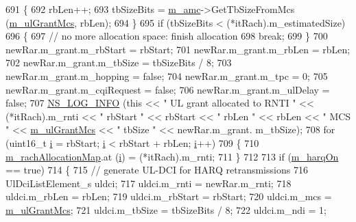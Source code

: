 \begin{DoxyCode}
691         \{
692           rbLen++;
693           tbSizeBits = \hyperlink{classns3_1_1TdBetFfMacScheduler_a3ba724ed3776a6cb493df6dd91b810d6}{m\_amc}->GetTbSizeFromMcs (\hyperlink{classns3_1_1TdBetFfMacScheduler_ae0ced77c5d773079c66921b86561de8c}{m\_ulGrantMcs}, rbLen);
694         \}
695       \textcolor{keywordflow}{if} (tbSizeBits < (*itRach).m\_estimatedSize)
696         \{
697           \textcolor{comment}{// no more allocation space: finish allocation}
698           \textcolor{keywordflow}{break};
699         \}
700       newRar.m\_grant.m\_rbStart = rbStart;
701       newRar.m\_grant.m\_rbLen = rbLen;
702       newRar.m\_grant.m\_tbSize = tbSizeBits / 8;
703       newRar.m\_grant.m\_hopping = \textcolor{keyword}{false};
704       newRar.m\_grant.m\_tpc = 0;
705       newRar.m\_grant.m\_cqiRequest = \textcolor{keyword}{false};
706       newRar.m\_grant.m\_ulDelay = \textcolor{keyword}{false};
707       \hyperlink{group__logging_gafbd73ee2cf9f26b319f49086d8e860fb}{NS\_LOG\_INFO} (\textcolor{keyword}{this} << \textcolor{stringliteral}{" UL grant allocated to RNTI "} << (*itRach).m\_rnti << \textcolor{stringliteral}{" rbStart "} << 
      rbStart << \textcolor{stringliteral}{" rbLen "} << rbLen << \textcolor{stringliteral}{" MCS "} << \hyperlink{classns3_1_1TdBetFfMacScheduler_ae0ced77c5d773079c66921b86561de8c}{m\_ulGrantMcs} << \textcolor{stringliteral}{" tbSize "} << newRar.m\_grant.
      m\_tbSize);
708       \textcolor{keywordflow}{for} (uint16\_t \hyperlink{bernuolliDistribution_8m_a6f6ccfcf58b31cb6412107d9d5281426}{i} = rbStart; \hyperlink{bernuolliDistribution_8m_a6f6ccfcf58b31cb6412107d9d5281426}{i} < rbStart + rbLen; \hyperlink{bernuolliDistribution_8m_a6f6ccfcf58b31cb6412107d9d5281426}{i}++)
709         \{
710           \hyperlink{classns3_1_1TdBetFfMacScheduler_a985948ee40a0d721009dea792474ee51}{m\_rachAllocationMap}.at (\hyperlink{bernuolliDistribution_8m_a6f6ccfcf58b31cb6412107d9d5281426}{i}) = (*itRach).m\_rnti;
711         \}
712 
713       \textcolor{keywordflow}{if} (\hyperlink{classns3_1_1TdBetFfMacScheduler_a8de90c082c621bf8d664fff8cf370acb}{m\_harqOn} == \textcolor{keyword}{true})
714         \{
715           \textcolor{comment}{// generate UL-DCI for HARQ retransmissions}
716           UlDciListElement\_s uldci;
717           uldci.m\_rnti = newRar.m\_rnti;
718           uldci.m\_rbLen = rbLen;
719           uldci.m\_rbStart = rbStart;
720           uldci.m\_mcs = \hyperlink{classns3_1_1TdBetFfMacScheduler_ae0ced77c5d773079c66921b86561de8c}{m\_ulGrantMcs};
721           uldci.m\_tbSize = tbSizeBits / 8;
722           uldci.m\_ndi = 1;

\end{DoxyCode}
